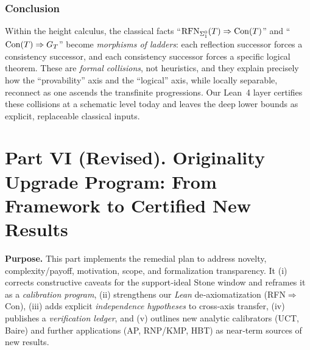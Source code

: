 \documentclass[11pt]{article}
\theoremstyle{definition}
\theoremstyle{remark}
\newcommand{\cnull}{c_0}
\newcommand{\linf}{\ell^\infty}
\newcommand{\WLPO}{\mathrm{WLPO}}
\newcommand{\BISH}{\mathrm{BISH}}
\newcommand{\DCw}{\mathrm{DC}_\omega}
\newcommand{\FT}{\mathrm{FT}}
\newcommand{\SigmaZero}{\Sigma_{0}}
\begin{document}
\section{Conclusion}

Within the height calculus, the classical facts “\(\RFNSigOne(T)\Rightarrow \Con(T)\)” and “\(\Con(T)\Rightarrow G_T\)”
become \emph{morphisms of ladders}: each reflection successor forces a consistency successor, and each consistency
successor forces a specific logical theorem. These are \emph{formal collisions}, not heuristics,
and they explain precisely how the “provability” axis and the “logical” axis, while locally separable,
reconnect as one ascends the transfinite progressions. Our Lean~4 layer certifies these collisions
at a schematic level today and leaves the deep lower bounds as explicit, replaceable classical inputs.




\part*{Part VI (Revised). Originality Upgrade Program: From Framework to Certified New Results}

\providecommand{\BISH}{\mathrm{BISH}}
\providecommand{\WLPO}{\mathrm{WLPO}}
\providecommand{\LPO}{\mathrm{LPO}}
\providecommand{\FT}{\mathrm{FT}}
\providecommand{\DCw}{\mathrm{DC}_\omega}
\providecommand{\PA}{\mathrm{PA}}
\providecommand{\HA}{\mathrm{HA}}
\providecommand{\Con}{\mathrm{Con}}
\providecommand{\RFNSigOne}{\mathrm{RFN}_{\Sigma^0_1}}
\providecommand{\SigmaZero}{\Sigma_0}
\providecommand{\linf}{\ell^\infty}
\providecommand{\cnull}{c_0}

\begin{mdframed}[style=status]
\textbf{Purpose.} This part implements the remedial plan to address novelty, complexity/payoff, motivation, scope, and formalization transparency. It (i) corrects constructive caveats for the support‑ideal Stone window and reframes it as a \emph{calibration program}, (ii) strengthens our \emph{Lean} de‑axiomatization (RFN\(\Rightarrow\)Con), (iii) adds explicit \emph{independence hypotheses} to cross‑axis transfer, (iv) publishes a \emph{verification ledger}, and (v) outlines new analytic calibrators (UCT, Baire) and further applications (AP, RNP/KMP, HBT) as near‑term sources of new results.
\end{mdframed}
\end{document}
